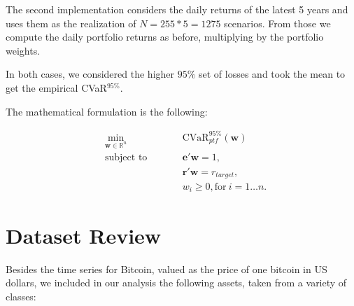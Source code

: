 \documentclass[12pt]{elsarticle}
\begin{document}
The second implementation considers the daily returns of the latest 5 years and uses them as the realization of $N= 255 * 5 = 1275$ scenarios. From those we compute the daily portfolio returns as before, multiplying by the portfolio weights.

In both cases, we considered the higher $95\%$ set of losses and took the mean to get the empirical CVaR$^{95\%}$.

The mathematical formulation is the following:


\begin{subequations}
\begin{align}
&\!\min_{\mathbf{w}\in \mathbb{R}^{n}}        &\qquad& \text{CVaR}^{95\%}_{ptf}(\mathbf{w}) \\
& \text{subject to} &      & \mathbf{e}'\mathbf{w} = 1 ,\label{eq:constraint1}\\
&                  &      & \mathbf{r}'\mathbf{w} = r_{target},\label{eq:constraint2}\\
&		 &        & w_{i} \geq 0, \text{for} \: i = 1\dots n.
\end{align}
\end{subequations}




\section{Dataset Review}


Besides the time series for Bitcoin, valued as the price of one bitcoin in US dollars, we included in our analysis the following assets, taken from a variety of classes:
\end{document}
